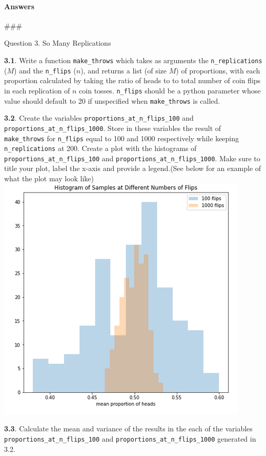 \documentclass[11pt]{article}
\makeatletter
\def\maxwidth{\ifdim\Gin@nat@width>\linewidth\linewidth
    \else\Gin@nat@width\fi}
\let\Oldincludegraphics\includegraphics
\renewcommand{\includegraphics}[1]{\Oldincludegraphics[width=.8\maxwidth]{#1}}
\makeatother
\begin{document}
    \paragraph{Answers}\label{answers}

    \#\#\#

Question 3. So Many Replications

\textbf{3.1}. Write a function \texttt{make\_throws} which takes as
arguments the \texttt{n\_replications} (\(M\)) and the \texttt{n\_flips}
(\(n\)), and returns a list (of size \(M\)) of proportions, with each
proportion calculated by taking the ratio of heads to to total number of
coin flips in each replication of \(n\) coin tosses. \texttt{n\_flips}
should be a python parameter whose value should default to 20 if
unspecified when \texttt{make\_throws} is called.

\textbf{3.2}. Create the variables
\texttt{proportions\_at\_n\_flips\_100} and
\texttt{proportions\_at\_n\_flips\_1000}. Store in these variables the
result of \texttt{make\_throws} for \texttt{n\_flips} equal to 100 and
1000 respectively while keeping \texttt{n\_replications} at 200. Create
a plot with the histograms of \texttt{proportions\_at\_n\_flips\_100}
and \texttt{proportions\_at\_n\_flips\_1000}. Make sure to title your
plot, label the x-axis and provide a legend.(See below for an example of
what the plot may look like) \includegraphics{./HW0Plot2.png}

\textbf{3.3}. Calculate the mean and variance of the results in the each
of the variables \texttt{proportions\_at\_n\_flips\_100} and
\texttt{proportions\_at\_n\_flips\_1000} generated in 3.2.
\end{document}
